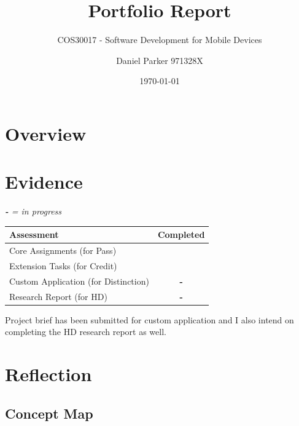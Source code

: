 \documentclass[11pt,english,numbers=endperiod,parskip=half]{scrartcl}
\title{Portfolio Report}
\subtitle{COS30017 - Software Development for Mobile Devices}
\author{Daniel Parker 971328X}
\date{\today}
\newcommand{\cmark}{\ding{51}}
\begin{document}
\maketitle
\thispagestyle{empty}

\section{Overview}

\section{Evidence}
\textit{\textbf{-} = in progress}
  \begin{table}[H]
    \begin{tabular}{|l|c|}
      \hline
      Assessment & Completed \\
      \hline
      Core Assignments (for Pass) & \cmark \\
      \hline
      Extension Tasks (for Credit) & \cmark \\
      \hline
      Custom Application (for Distinction) & \textbf{-} \\
      \hline
      Research Report (for HD) & \textbf{-} \\
      \hline
    \end{tabular}
  \end{table}
  Project brief has been submitted for custom application and I also intend on
  completing the HD research report as well.
\section{Reflection}
  \subsection{Concept Map}
    \begin{figure}[H]
    \\
    \end{figure}
\end{document}
